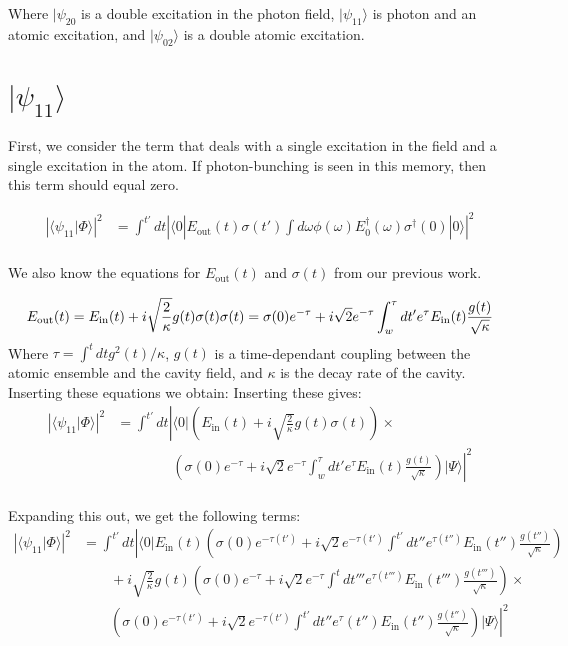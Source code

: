 \documentclass[12pt]{article}
\begin{document}
Where $| \psi_{20}$ is a double excitation in the photon field, $| \psi_{11} \rangle $ is photon and an atomic excitation, and $ | \psi_{02} \rangle $ is a double atomic excitation. 
\section{$| \psi_{11} \rangle$}
First, we consider the term that deals with a single excitation in the field and a single
excitation in the atom. If photon-bunching is seen in this memory, then this term should
equal zero.

\begin{align}
\left | \langle \psi_{11} | \Phi \rangle \right | ^2 &=\int^{t'} dt \left | \langle 0 | E_\textrm{out}(t) \sigma(t') \int d \omega \phi(\omega)E^\dagger_0(\omega)
\sigma^\dagger(0) | 0 \rangle \right |^2 \\
\end{align}


We also know the equations for $E_\text{out} (t)$ and $\sigma (t)$ from our previous work.

\begin{equation}
E_\textrm{out}(t) = E_\textrm{in}(t) + i \sqrt{\frac{2}{\kappa}} g(t) \sigma(t)\\
\sigma(t) = \sigma(0) e^{-\tau} + i\sqrt{2} e^{-\tau} \int^\tau_w d t' e^\tau E_\textrm{in}(t) \frac{g(t)}{\sqrt{\kappa}}
\end{equation}
Where $\tau = \int^t dt g^2(t)/\kappa$, $g(t)$ is a time-dependant coupling between the atomic ensemble and the cavity field, and $\kappa$ is the decay rate of the cavity. Inserting these equations we obtain:
Inserting these gives:
\begin{align}
\left | \langle \psi_{11} | \Phi \rangle \right | ^2 &= \int^{t'} dt \left | \langle 0 |
   \left(  E_\textrm{in}(t) + i \sqrt{\frac{2}{\kappa}} g(t) \sigma(t) \right ) \times \right.\\
   &\left. \qquad \qquad \left (\sigma(0) e^{-\tau} + i\sqrt{2} e^{-\tau} \int^\tau_w d t' e^\tau E_\textrm{in}(t) \frac{g(t)}{\sqrt{\kappa}}\right)|\Psi \rangle \right |^2\\
\end{align}

Expanding this out, we get the following terms:
\begin{align}
\left | \langle \psi_{11} | \Phi \rangle \right | ^2 &= 
\int^{t'} dt \left | \langle 0 | E_\textrm{in}(t) \left( \sigma(0) e^{-\tau(t')} + i\sqrt{2} e^{-\tau(t')} \int^{t'} d t'' e^{\tau(t'')} E_\textrm{in}(t'') \frac{g(t'')}{\sqrt{\kappa}} \right )\right. \\
&\qquad+ i \sqrt{\frac{2}{\kappa}}g(t)\left (\sigma(0) e^{-\tau} + i\sqrt{2} e^{-\tau} \int^{t}d t''' e^{\tau(t''')} E_\textrm{in}(t''') \frac{g(t''')}{\sqrt{\kappa}} \right) \times\\
&\left.\qquad \left(\sigma(0) e^{-\tau(t')} + i\sqrt{2} e^{-\tau(t')} \int^{t'} d t'' e^\tau(t'') E_\textrm{in}(t'') \frac{g(t'')}{\sqrt{\kappa}}\right) | \Psi \rangle \right |^2 
\end{align}
\end{document}
